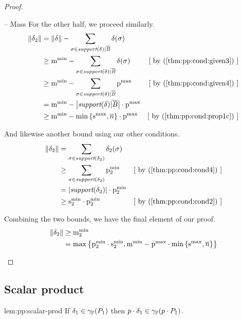 \begin{proof}
\begin{subproof}{ -- Mass}
For the other half, we proceed similarly.
\begin{align*}
\pmass{\delta_2}
& = \pmass{\delta} - \sum_{\sigma \in \supout} \delta(\sigma) \\
& \geq \mmin{} - \sum_{\sigma \in \supout} \delta(\sigma)
& \mathstep{by \cnumref{thm:pp:cond:given3}} \\
& \geq \mmin{} - \sum_{\sigma \in \supout} \pmax{}
 & \mathstep{by \cnumref{thm:pp:cond:given4}} \\
& = \mmin{} - \setsize{\supout} \cdot \pmax{} \\
& \geq \mmin{} - \minparen{\smax{}, \nn} \cdot \pmax{}
& \mathstep{by \cnumref{thm:pp:cond:prop1c}}
\end{align*}

And likewise another bound using our other conditions.
\begin{align*}
\pmass{\delta_2} & = \sum_{\sigma \in \supdn} \delta_2(\sigma) \\
                 & \geq \sum_{\sigma \in \supdn} \pmin{2}
                 & \mathstep{by \cnumref{thm:pp:cond:cond4}} \\
                 & = \setsize{\supdn} \cdot \pmin{2} \\
                 & \geq \smin{2} \cdot \pmin{2} & \mathstep{by \cnumref{thm:pp:cond:cond2}}
\end{align*}

Combining the two bounds, we have the final element of our proof.
\begin{align*}
\mathord{\parallel}\delta_2\mathord{\parallel} & \geq \mathrm{m}^\mathrm{min}_{2} \\
& = \max\left\{ \mathrm{p}^\mathrm{min}_{2} \cdot \mathrm{s}^\mathrm{min}_{2}, \mathrm{m}^\mathrm{min}_{} - \mathrm{p}^\mathrm{max}_{} \cdot \min\left\{ \mathrm{s}^\mathrm{max}_{}, \overline{n} \right\} \right\}
\end{align*}
\end{subproof}
\end{proof}

\subsection{Scalar product}
\begin{replemma}{lem:pp:scalar-prod}
If $\delta_1 \in \gamma_{\mathbb{P}}(P_{1})$ then $p \cdot \delta_1 \in \gamma_{\mathbb{P}}(p \cdot P_{1})$.
\end{replemma}

